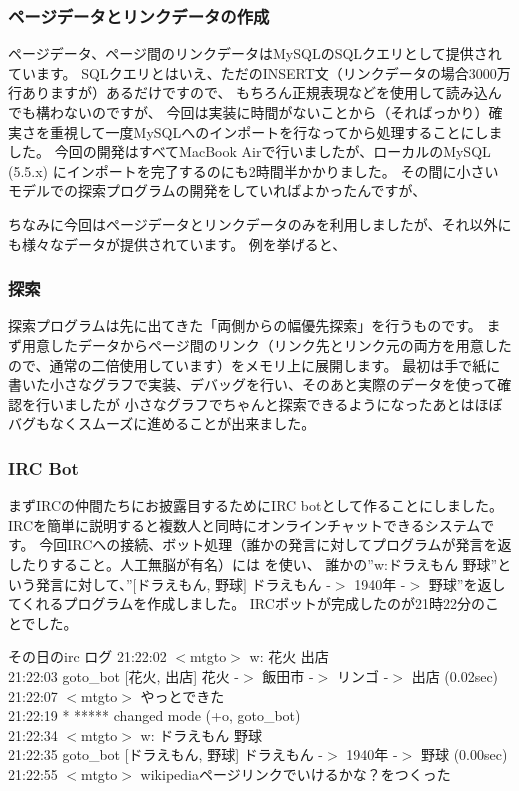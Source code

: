 \subsubsection{ページデータとリンクデータの作成}
ページデータ、ページ間のリンクデータはMySQLのSQLクエリとして提供されています。
SQLクエリとはいえ、ただのINSERT文（リンクデータの場合3000万行ありますが）あるだけですので、
もちろん正規表現などを使用して読み込んでも構わないのですが、
今回は実装に時間がないことから（そればっかり）確実さを重視して一度MySQLへのインポートを行なってから処理することにしました。
今回の開発はすべてMacBook Airで行いましたが、ローカルのMySQL (5.5.x) にインポートを完了するのにも2時間半かかりました。
その間に小さいモデルでの探索プログラムの開発をしていればよかったんですが、

ちなみに今回はページデータとリンクデータのみを利用しましたが、それ以外にも様々なデータが提供されています。
例を挙げると、

\subsubsection{探索}
探索プログラムは先に出てきた「両側からの幅優先探索」を行うものです。
まず用意したデータからページ間のリンク（リンク先とリンク元の両方を用意したので、通常の二倍使用しています）をメモリ上に展開します。
最初は手で紙に書いた小さなグラフで実装、デバッグを行い、そのあと実際のデータを使って確認を行いましたが
小さなグラフでちゃんと探索できるようになったあとはほぼバグもなくスムーズに進めることが出来ました。

\subsubsection{IRC Bot}
まずIRCの仲間たちにお披露目するためにIRC botとして作ることにしました。
IRCを簡単に説明すると複数人と同時にオンラインチャットできるシステムです。
今回IRCへの接続、ボット処理（誰かの発言に対してプログラムが発言を返したりすること。人工無脳が有名）には
を使い、
誰かの''w:ドラえもん 野球''という発言に対して、''$[$ドラえもん, 野球$]$ ドラえもん -$>$ 1940年 -$>$ 野球''を返してくれるプログラムを作成しました。
IRCボットが完成したのが21時22分のことでした。

\begin{itembox}{その日のirc ログ}
  21:22:02 $<$mtgto$>$ w: 花火 出店\\
  21:22:03 {goto\_bot} [花火, 出店] 花火 -$>$ 飯田市 -$>$ リンゴ -$>$ 出店 (0.02sec)\\
  21:22:07 $<$mtgto$>$ やっとできた\\
  21:22:19 * ***** changed mode (+o, goto\_bot)\\
  21:22:34 $<$mtgto$>$ w: ドラえもん 野球\\
  21:22:35 {goto\_bot} [ドラえもん, 野球] ドラえもん -$>$ 1940年 -$>$ 野球 (0.00sec)\\
  21:22:55 $<$mtgto$>$ wikipediaページリンクでいけるかな？をつくった
\end{itembox}

